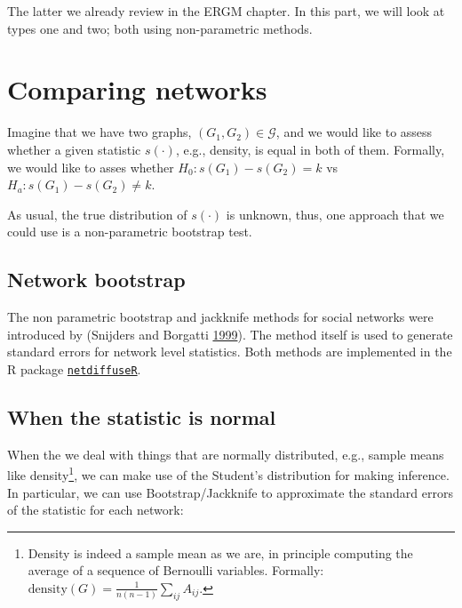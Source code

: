 \documentclass[]{book}
\begin{document}
The latter we already review in the ERGM chapter. In this part, we will look
at types one and two; both using non-parametric methods.

\hypertarget{comparing-networks}{%
\section{Comparing networks}\label{comparing-networks}}

Imagine that we have two graphs, \((G_1,G_2) \in \mathcal{G}\), and we would like
to assess whether a given statistic \(s(\cdot)\), e.g., density, is equal in both of them.
Formally, we would like to asses whether \(H_0: s(G_1) - s(G_2) = k\) vs
\(H_a: s(G_1) - s(G_2) \neq k\).

As usual, the true distribution of \(s(\cdot)\) is unknown, thus, one approach that
we could use is a non-parametric bootstrap test.

\hypertarget{network-bootstrap}{%
\subsection{Network bootstrap}\label{network-bootstrap}}

The non parametric bootstrap and jackknife methods for social networks were
introduced by (Snijders and Borgatti \protect\hyperlink{ref-Snijders1999}{1999}). The method itself is used to generate standard
errors for network level statistics. Both methods are implemented in the R
package \href{https://cran.r-project.org/package=netdiffuseR}{\texttt{netdiffuseR}}.

\hypertarget{when-the-statistic-is-normal}{%
\subsection{When the statistic is normal}\label{when-the-statistic-is-normal}}

When the we deal with things that are normally distributed, e.g., sample means
like density\footnote{Density is indeed a sample mean as we are, in principle
  computing the average of a sequence of Bernoulli variables. Formally:
  \(\mbox{density}(G) = \frac{1}{n(n-1)}\sum_{ij}A_{ij}\).},
we can make use of the Student's distribution for making inference. In particular,
we can use Bootstrap/Jackknife to approximate the standard errors of the statistic
for each network:
\end{document}
